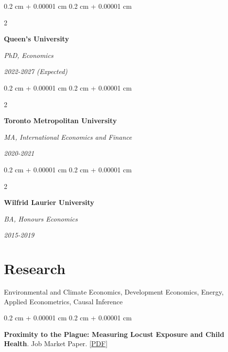 \documentclass[10pt, letterpaper]{article}
\newenvironment{highlights}{
    \begin{itemize}[
        topsep=0.10 cm,
        parsep=0.10 cm,
        partopsep=0pt,
        itemsep=0pt,
        leftmargin=0.4 cm + 10pt
    ]
}{
    \end{itemize}
} %
\newenvironment{onecolentry}{
    \begin{adjustwidth}{
        0.2 cm + 0.00001 cm
    }{
        0.2 cm + 0.00001 cm
    }
}{
    \end{adjustwidth}
} %
\newenvironment{twocolentry}[2][]{
    \onecolentry
    \def\secondColumn{#2}
    \setcolumnwidth{\fill, 4.5 cm}
    \begin{paracol}{2}
}{
    \switchcolumn \raggedleft \secondColumn
    \end{paracol}
    \endonecolentry
} %
\let\hrefWithoutArrow\href
\renewcommand{\href}[2]{\hrefWithoutArrow{#1}{\ifthenelse{\equal{#2}{}}{ }{#2 }\raisebox{.15ex}{\footnotesize \faExternalLink*}}}
\begin{document}
        
        \begin{twocolentry}{
            
            
        \textit{2022-2027 (Expected)}}
            \textbf{Queen's University}

            \textit{PhD, Economics}
        \end{twocolentry}

\vspace{0.2 cm}
        \begin{twocolentry}{
 
        \textit{2020-2021}
        }
            \textbf{Toronto Metropolitan University}

            \textit{MA, International Economics and Finance}
            
        \end{twocolentry}
\vspace{0.2 cm}
        \begin{twocolentry}{
 
        \textit{2015-2019}
        }
            \textbf{Wilfrid Laurier University}

            \textit{BA, Honours Economics}
            
        \end{twocolentry}


    
    \section{Research}
Environmental and Climate Economics, Development Economics, Energy, Applied Econometrics, Causal Inference
\vspace{0.2cm}

\begin{onecolentry}
    \textbf{Proximity to the Plague: Measuring Locust Exposure and Child Health}. Job Market Paper.
    \hrefWithoutArrow{https://zemarhakim.github.io/locust_kenya_sept_2025.pdf}{[PDF]}
\end{onecolentry}
\vspace{0.25cm}
\end{document}
